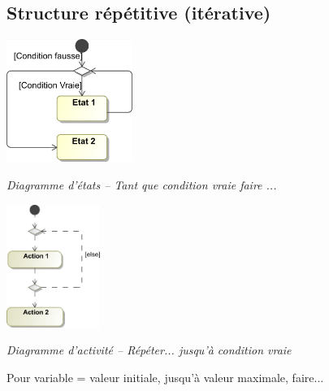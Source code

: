 \documentclass[10pt,fleqn]{article} %
\begin{document}
\subsection{Structure répétitive (itérative)}
\begin{minipage}[c]{.48\linewidth}
\begin{center}
\includegraphics[height=4cm]{images/Iteratif_stm}

\textit{Diagramme d'états -- Tant que condition vraie faire ...}
\end{center}
\end{minipage} \hfill
\begin{minipage}[c]{.48\linewidth}
\begin{center}
\includegraphics[height=4cm]{images/Iteratif_act}

\textit{Diagramme d'activité -- Répéter... jusqu'à condition vraie}
\end{center}
\end{minipage}


\begin{exemple}
Pour variable = valeur initiale, jusqu'à valeur maximale, faire...
\end{exemple}
\end{document}
